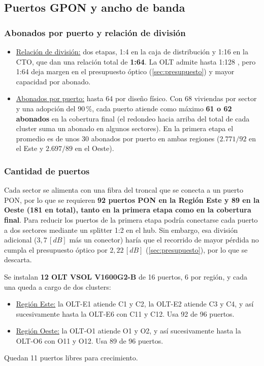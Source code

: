 \subsection{Puertos GPON y ancho de banda}
\label{sec:puertos}

\subsubsection{Abonados por puerto y relación de división}
\begin{itemize}
    \item \underline{Relación de división:} dos etapas, 1:4 en la caja de distribución y 1:16 en la CTO, que dan una relación total de \textbf{1:64}. La OLT admite hasta 1:128 \cite{vsol_olt}, pero 1:64 deja margen en el presupuesto óptico (\autoref{sec:presupuesto}) y mayor capacidad por abonado.
    \item \underline{Abonados por puerto:} hasta 64 por diseño físico. Con 68 viviendas por sector y una adopción del 90\,\%, cada puerto atiende como máximo \textbf{61 o 62 abonados} en la cobertura final (el redondeo hacia arriba del total de cada cluster suma un abonado en algunos sectores). En la primera etapa el promedio es de unos 30 abonados por puerto en ambas regiones ($2.771 / 92$ en el Este y $2.697 / 89$ en el Oeste).
\end{itemize}

\subsubsection{Cantidad de puertos}
Cada sector se alimenta con una fibra del troncal que se conecta a un puerto PON, por lo que se requieren \textbf{92 puertos PON en la Región Este y 89 en la Oeste (181 en total), tanto en la primera etapa como en la cobertura final}. Para reducir los puertos de la primera etapa podría conectarse cada puerto a dos sectores mediante un splitter 1:2 en el hub. Sin embargo, esa división adicional ($3{,}7 \, [dB]$ más un conector) haría que el recorrido de mayor pérdida no cumpla el presupuesto óptico por $2{,}22 \, [dB]$ (\autoref{sec:presupuesto}), por lo que se descarta.

Se instalan \textbf{12 OLT VSOL V1600G2-B} de 16 puertos, 6 por región, y cada una queda a cargo de dos clusters:
\begin{itemize}
    \item \underline{Región Este:} la OLT-E1 atiende C1 y C2, la OLT-E2 atiende C3 y C4, y así sucesivamente hasta la OLT-E6 con C11 y C12. Usa 92 de 96 puertos.
    \item \underline{Región Oeste:} la OLT-O1 atiende O1 y O2, y así sucesivamente hasta la OLT-O6 con O11 y O12. Usa 89 de 96 puertos.
\end{itemize}
Quedan 11 puertos libres para crecimiento.

